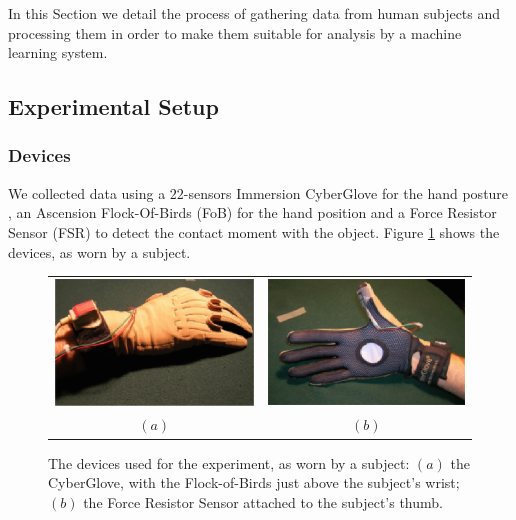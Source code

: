 In this Section we detail the process of gathering data from human
subjects and processing them in order to make them suitable for
analysis by a machine learning system.

\subsection{Experimental Setup}

\subsubsection*{Devices}

We collected data using a $22$-sensors Immersion CyberGlove for the
hand posture \cite{cyberglove}, an Ascension Flock-Of-Birds (FoB) for
the hand position \cite{fob} and a Force Resistor Sensor (FSR) to
detect the contact moment with the object. Figure \ref{fig:devices}
shows the devices, as worn by a subject.

\begin{figure}[htbp]
  \begin{center}
    \begin{tabular}{cc}
      \includegraphics[width=0.45\linewidth]{devices1.eps} &
      \includegraphics[width=0.45\linewidth]{devices2.eps} \\
      $(a)$ & $(b)$
    \end{tabular}
    \caption{The devices used for the experiment, as worn by a
    subject: $(a)$ the CyberGlove, with the Flock-of-Birds just above
    the subject's wrist; $(b)$ the Force Resistor Sensor attached to
    the subject's thumb.}
    \label{fig:devices}
  \end{center}
\end{figure}

